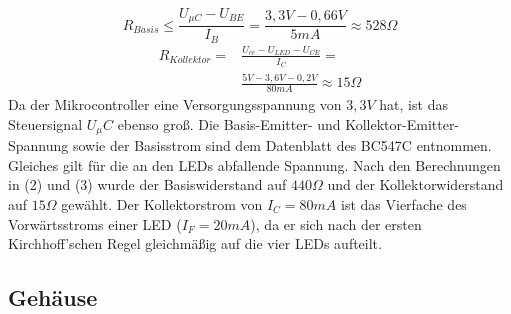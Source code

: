 \documentclass[journal, a4paper]{IEEEtran}
\begin{document}
			\begin{equation}
				R_{Basis} \leq \frac{U_{\mu C}-U_{BE}}{I_B} =  \frac{3,3V-0,66V}{5mA} \approx 528\Omega
			\end{equation}
			\begin{equation}
				\begin{split}
					R_{Kollektor} = & \frac{U_{cc}-U_{LED}-U_{CE}}{I_{C}} = \\ 
					&\frac{5V-3,6V-0,2V}{80mA} \approx 15\Omega
				\end{split}
			\end{equation}
			Da der Mikrocontroller eine Versorgungsspannung von $3,3V$ hat, ist das Steuersignal $U_\mu C$ ebenso groß. Die Basis-Emitter- und Kollektor-Emitter-Spannung sowie der Basisstrom sind dem Datenblatt des BC547C entnommen. Gleiches gilt für die an den LEDs abfallende Spannung. Nach den Berechnungen in (2) und (3) wurde der Basiswiderstand auf $440\Omega$ und der Kollektorwiderstand auf  $15\Omega$ gewählt.
			Der Kollektorstrom von $I_C=80mA$ ist das Vierfache des Vorwärtsstroms einer LED ($I_F=20mA$), da er sich nach der ersten Kirchhoff'schen Regel gleichmäßig auf die vier LEDs aufteilt.
		\subsection{Gehäuse}
\end{document}
